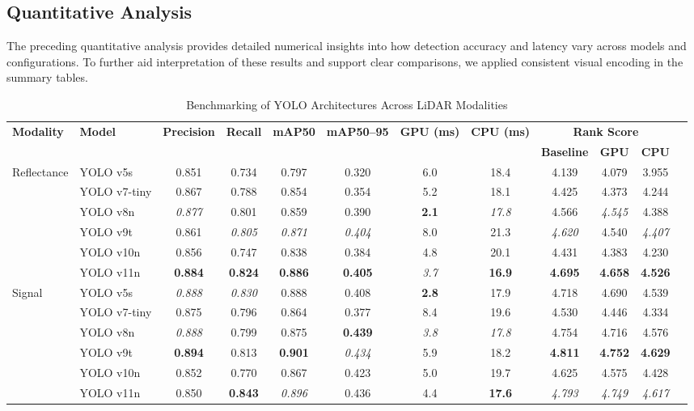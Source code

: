 \documentclass[runningheads]{llncs}
\begin{document}
\subsection{Quantitative Analysis}
The preceding quantitative analysis provides detailed numerical insights into how detection accuracy and latency vary across models and configurations. To further aid interpretation of these results and support clear comparisons, we applied consistent visual encoding in the summary tables.

\begin{table}[h!]
    \centering
    \tiny
    \caption{Benchmarking of YOLO Architectures Across LiDAR Modalities}
\begin{tabular}{@{}llcccccccccc@{}}
\toprule
\textbf{Modality} & \textbf{Model} 
& \textbf{Precision} & \textbf{Recall} 
& \textbf{mAP50} & \textbf{mAP50–95} 
& \textbf{GPU (ms)} & \textbf{CPU (ms)} 
& \multicolumn{3}{c}{\textbf{Rank Score}} \\
\cmidrule(lr){9-11}
& & & & & & & & \textbf{Baseline} & \textbf{GPU} & \textbf{CPU} \\
\midrule


 \multirow{}{}{Reflectance}
& YOLO v5s 
& 0.851 & 0.734 & 0.797 & 0.320 
& 6.0 & 18.4 
& 4.139 & 4.079 & 3.955 \\
& YOLO v7-tiny 
& 0.867 & 0.788 & 0.854 & 0.354 
& 5.2 & 18.1 
& 4.425 & 4.373 & 4.244 \\
& YOLO v8n 
& \textit{0.877} & 0.801 & 0.859 & 0.390 
& \textbf{2.1} & \textit{17.8} 
& 4.566 & \textit{4.545} & 4.388 \\
& YOLO v9t 
& 0.861 & \textit{0.805} & \textit{0.871} & \textit{0.404} 
& 8.0 & 21.3 
& \textit{4.620} & 4.540 & \textit{4.407} \\
& YOLO v10n 
& 0.856 & 0.747 & 0.838 & 0.384 
& 4.8 & 20.1 
& 4.431 & 4.383 & 4.230 \\
& YOLO v11n 
& \textbf{0.884} & \textbf{0.824} & \textbf{0.886} & \textbf{0.405} 
& \textit{3.7} & \textbf{16.9} 
& \textbf{4.695} & \textbf{4.658} & \textbf{4.526} \\
\midrule
\multirow{}{}{Signal}
& YOLO v5s     
& \textit{0.888} & \textit{0.830} & 0.888 & 0.408 
& \textbf{2.8} & 17.9 
& 4.718 & 4.690 & 4.539 \\
& YOLO v7-tiny 
& 0.875 & 0.796 & 0.864 & 0.377 
& 8.4 & 19.6 
& 4.530 & 4.446 & 4.334 \\
& YOLO v8n     
& \textit{0.888} & 0.799 & 0.875 & \textbf{0.439} 
& \textit{3.8} & \textit{17.8} 
& 4.754 & 4.716 & 4.576 \\
& YOLO v9t     
& \textbf{0.894} & 0.813 & \textbf{0.901} & \textit{0.434} 
& 5.9 & 18.2 
& \textbf{4.811} & \textbf{4.752} & \textbf{4.629} \\
& YOLO v10n    
& 0.852 & 0.770 & 0.867 & 0.423 
& 5.0 & 19.7 
& 4.625 & 4.575 & 4.428 \\
& YOLO v11n    
& 0.850 & \textbf{0.843} & \textit{0.896} & 0.436 
& 4.4 & \textbf{17.6} 
& \textit{4.793} & \textit{4.749} & \textit{4.617} \\
\midrule



\end{tabular}
\end{table}
\end{document}
